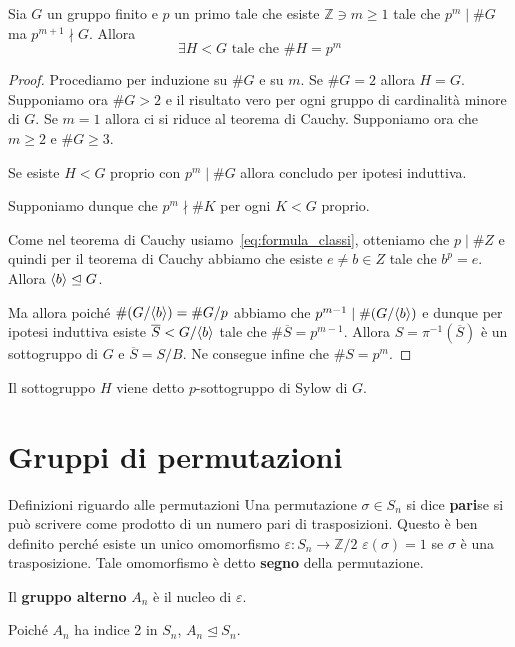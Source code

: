 \begin{theorem}
    Sia \(G\) un gruppo finito e \(p\) un primo tale che esiste \(\mathbb{Z} \ni
    m \ge 1\)  tale che \(p^{m} \mid \# G\) ma \(p^{m+1} \nmid G\). Allora
    \[
        \exists H < G \text{ tale che } \# H = p^{m}
    \]
\end{theorem}
\begin{proof}
    Procediamo per induzione su \(\# G\) e su \(m\). Se \(\# G = 2\) allora \(H = G\).
    Supponiamo ora \(\#G > 2\) e il risultato vero per ogni gruppo di
    cardinalità minore di \(G\). Se \(m=1\) allora ci si riduce al teorema di
    Cauchy. Supponiamo ora che \(m \ge 2\) e \(\#G \ge 3\).

    Se esiste \(H < G\) proprio con \(p^{m} \mid \# G\) allora concludo per ipotesi
    induttiva.

    Supponiamo dunque che \(p^{m} \nmid \# K\) per ogni \(K < G\) proprio.

    Come nel teorema di Cauchy usiamo~\eqref{eq:formula_classi}, otteniamo che
    \(p \mid \# Z\) e quindi per il teorema di Cauchy abbiamo che esiste \(e \neq b
    \in Z\) tale che \(b^{p} = e\). Allora \({\left\langle b\right\rangle} \trianglelefteq G\). 

    Ma allora poiché \(\# (G / {\left\langle b\right\rangle} ) = \# G / p\) abbiamo che \(p^{m-1} \mid
    \# {(G / {\left\langle b\right\rangle} )}\) e dunque per ipotesi induttiva esiste \(\overline{S}
    < G / {\left\langle b\right\rangle} \) tale che \(\# \overline{S} = p^{m-1}\). Allora \(S = \pi
    ^{-1}{(\overline{S})}\) è un sottogruppo di \(G\) e \(\overline{S} = S /
    B\). Ne consegue infine che \(\# S = p^{m}\).
\end{proof}
\begin{remark}
    Il sottogruppo \(H\) viene detto \(p\)-sottogruppo di Sylow di \(G\).
\end{remark}


\section{Gruppi di permutazioni}
\begin{definition}{Definizioni riguardo alle permutazioni}
    Una permutazione \(\sigma \in S_n\) si dice \textbf{pari}se si può scrivere
    come prodotto di un numero pari di trasposizioni. Questo è ben definito
    perché esiste un unico omomorfismo \(\varepsilon : S_n \to \mathbb{Z} / 2\)
    \(\varepsilon(\sigma) = 1\) se \(\sigma\) è una trasposizione. Tale
    omomorfismo è detto \textbf{segno} della permutazione.

    Il \textbf{gruppo alterno} \(A_n\) è il nucleo di \(\varepsilon\).
\end{definition}
Poiché \(A_{n}\) ha indice 2 in \(S_{n}\), \(A_{n} \trianglelefteq S_{n} \).

